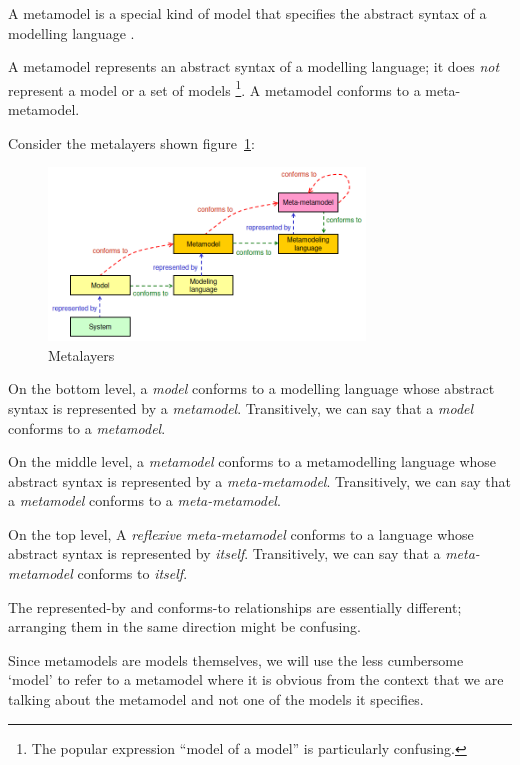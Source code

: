 A metamodel is a special kind of model that specifies the abstract syntax of a modelling language \cite{OMG-MDA-Foundation-Model}.

A metamodel represents an abstract syntax of a modelling language; it does \textit{not} represent a model or a set of models
\footnote{The popular expression ``model of a model'' is particularly confusing.}.
A metamodel conforms to a meta-metamodel.

Consider the metalayers shown figure~\ref{figure:metalayers}:

\begin{figure}[h]
	\centering
	\includegraphics[width=0.75\textwidth]{images/metalayers.png}
	\caption{Metalayers \cite{Genova09}}
	\label{figure:metalayers}
\end{figure}

On the bottom level, a \textit{model} conforms to a modelling language whose abstract syntax is represented by a \textit{metamodel}.
Transitively, we can say that a \textit{model} conforms to a \textit{metamodel}.

On the middle level, a \textit{metamodel} conforms to a metamodelling language whose abstract syntax is represented by a \textit{meta-metamodel}.
Transitively, we can say that a \textit{metamodel} conforms to a \textit{meta-metamodel}.

On the top level, A \textit{reflexive meta-metamodel} conforms to a language whose abstract syntax is represented by \textit{itself}.
Transitively, we can say that a \textit{meta-metamodel} conforms to \textit{itself}.

The represented-by and conforms-to relationships are essentially different; arranging them in the same direction might be confusing.

Since metamodels are models themselves, we will use the less cumbersome `model' to refer to a metamodel where it is obvious from the context that we are talking about the metamodel and not one of the models it specifies.  







